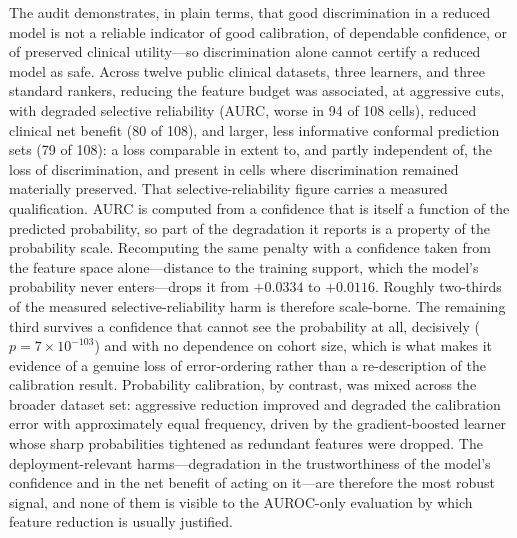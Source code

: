 \documentclass[fleqn,10pt]{wlscirep}
\newcommand{\result}[1]{#1}
\begin{document}
The audit demonstrates, in plain terms, that good discrimination in a reduced model is not a reliable
indicator of good calibration, of dependable confidence, or of preserved clinical utility---so
discrimination alone cannot certify a reduced model as safe. Across twelve public clinical datasets, three learners,
and three standard rankers, reducing the feature budget was associated, at aggressive cuts, with
degraded selective reliability (AURC, worse in 94 of 108 cells), reduced clinical net benefit (80 of
108), and larger, less informative conformal prediction sets (79 of 108): a loss comparable in extent
to, and partly independent of, the loss of discrimination, and present in cells where discrimination
remained materially preserved. That selective-reliability figure carries a measured qualification. AURC is computed
from a confidence that is itself a function of the predicted probability, so part of the degradation
it reports is a property of the probability scale. Recomputing the same penalty with a confidence
taken from the feature space alone---distance to the training support, which the model's probability
never enters---drops it from \result{$+0.0334$} to \result{$+0.0116$}. Roughly \result{two-thirds} of
the measured selective-reliability harm is therefore scale-borne. The
remaining \result{third} survives a confidence that cannot see the probability at all, decisively
(\result{$p=7\times10^{-103}$}) and with no dependence on cohort size, which is what makes it
evidence of a genuine loss of error-ordering rather than a re-description of the calibration result.
Probability calibration, by contrast, was mixed across the broader
dataset set: aggressive reduction improved and degraded the calibration error with approximately equal
frequency, driven by the gradient-boosted learner whose sharp probabilities tightened as redundant
features were dropped. The deployment-relevant harms---degradation in the trustworthiness of the
model's confidence and in the net benefit of acting on it---are therefore the most robust signal, and
none of them is visible to the AUROC-only evaluation by which feature reduction is usually justified.
\end{document}
